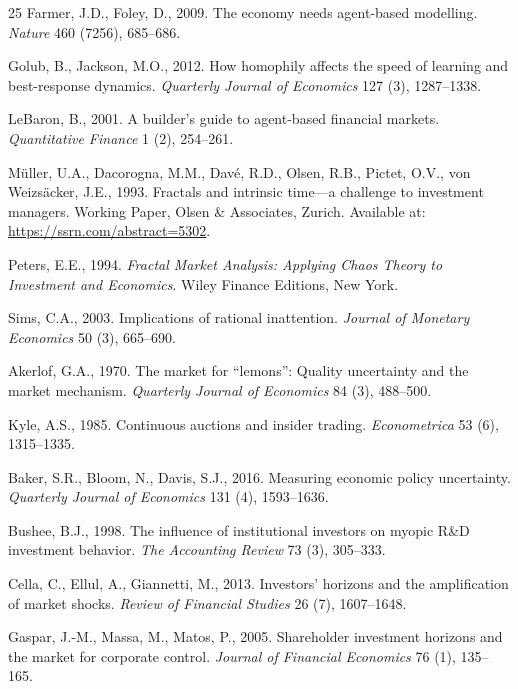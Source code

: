 \begin{thebibliography}{25}
Farmer, J.D., Foley, D., 2009.
The economy needs agent-based modelling.
\textit{Nature} 460 (7256), 685--686.

Golub, B., Jackson, M.O., 2012.
How homophily affects the speed of learning and best-response dynamics.
\textit{Quarterly Journal of Economics} 127 (3), 1287--1338.

LeBaron, B., 2001.
A builder's guide to agent-based financial markets.
\textit{Quantitative Finance} 1 (2), 254--261.

M{\"u}ller, U.A., Dacorogna, M.M., Dav{\'e}, R.D., Olsen, R.B.,
Pictet, O.V., von Weizs{\"a}cker, J.E., 1993.
Fractals and intrinsic time---a challenge to investment managers.
Working Paper, Olsen \& Associates, Zurich.
Available at: \url{https://ssrn.com/abstract=5302}.

Peters, E.E., 1994.
\textit{Fractal Market Analysis: Applying Chaos Theory to Investment and
Economics}.
Wiley Finance Editions, New York.

Sims, C.A., 2003.
Implications of rational inattention.
\textit{Journal of Monetary Economics} 50 (3), 665--690.

Akerlof, G.A., 1970.
The market for ``lemons'': Quality uncertainty and the market mechanism.
\textit{Quarterly Journal of Economics} 84 (3), 488--500.

Kyle, A.S., 1985.
Continuous auctions and insider trading.
\textit{Econometrica} 53 (6), 1315--1335.

Baker, S.R., Bloom, N., Davis, S.J., 2016.
Measuring economic policy uncertainty.
\textit{Quarterly Journal of Economics} 131 (4), 1593--1636.

Bushee, B.J., 1998.
The influence of institutional investors on myopic R\&D investment behavior.
\textit{The Accounting Review} 73 (3), 305--333.

Cella, C., Ellul, A., Giannetti, M., 2013.
Investors' horizons and the amplification of market shocks.
\textit{Review of Financial Studies} 26 (7), 1607--1648.

Gaspar, J.-M., Massa, M., Matos, P., 2005.
Shareholder investment horizons and the market for corporate control.
\textit{Journal of Financial Economics} 76 (1), 135--165.


\end{thebibliography}
